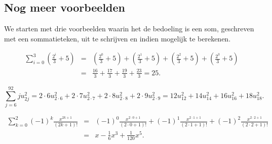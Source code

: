 \documentclass{ximera}
\begin{document}
\subsection{Nog meer voorbeelden} We starten met drie voorbeelden
waarin het de bedoeling is een som, geschreven met een
sommatieteken, uit te schrijven en indien mogelijk te berekenen.
\begin{example} \begin{eqnarray*}
\sum_{i=0}^3\left(\frac{2^i}{3}+5\right)&=&\left(\frac{2^0}{3}+5\right)+\left(\frac{2^1}{3}+5\right)+\left(\frac{2^2}{3}+5\right)+\left(\frac{2^3}{3}+5\right)\\
&=&\frac{16}{3}+\frac{17}{3}+\frac{19}{3}+\frac{23}{3}=25.
\end{eqnarray*} \end{example} \begin{example}
\[\sum_{j=6}^92ju_{2j}^2=2\cdot6u_{2\cdot6}^2+2\cdot7u_{2\cdot7}^2+2\cdot8u_{2\cdot8}^2+2\cdot9u_{2\cdot9}^2=12u_{12}^2+14u_{14}^2+16u_{16}^2+18u_{18}^2.\]
\end{example} \begin{example}\footnotemark \begin{eqnarray*}
\sum_{k=0}^2(-1)^k\frac{x^{2k+1}}{(2k+1)!}&=&(-1)^0\frac{x^{2\cdot0+1}}{(2\cdot0+1)!}+(-1)^1\frac{x^{2\cdot1+1}}{(2\cdot1+1)!}+(-1)^2\frac{x^{2\cdot2+1}}{(2\cdot2+1)!}\\
&=&x-\frac{1}{6}x^3+\frac{1}{120}x^5. \end{eqnarray*}
\end{example} 
\end{document}

